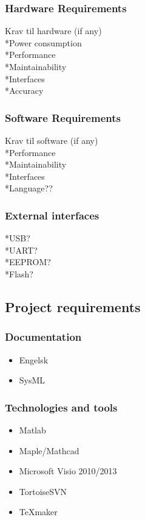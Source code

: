 \subsubsection{Hardware Requirements}
Krav til hardware (if any)\\
*Power consumption\\
*Performance\\
*Maintainability\\
*Interfaces\\
*Accuracy\\

\subsubsection{Software Requirements}
Krav til software (if any)\\
*Performance\\
*Maintainability\\
*Interfaces\\
*Language??\\

\subsubsection{External interfaces}
*USB?\\
*UART?\\
*EEPROM?\\
*Flash?\\

\subsection{Project requirements}

\subsubsection{Documentation}
\begin{itemize}
\item Engelsk
\item SysML
\end{itemize}

\subsubsection{Technologies and tools}
\begin{itemize}
\item Matlab
\item Maple/Mathcad
\item Microsoft Visio 2010/2013
\item TortoiseSVN
\item TeXmaker
\end{itemize}

